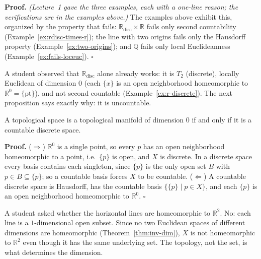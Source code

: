 \documentclass[11pt]{report}
\makeatletter
\newcounter{thmcounter}[section]
\renewenvironment{proof}[1][Proof]{\noindent\textbf{#1.} }{\hfill$\square$\par\vspace{5pt}}
\newcommand{\thmlabel}[1]{\edef\@currentlabel{\arabic{section}.\arabic{thmcounter}}\label{#1}}
\newcommand{\leeref}[1]{\par\smallskip{\raggedleft\footnotesize\textsc{Lee}:\ #1\par}}
\makeatother
\begin{document}
\begin{proof}
\textit{(Lecture~1 gave the three examples, each with a one-line reason; the verifications are in the examples above.)} The examples above exhibit this, organized by the property that fails: $\mathbb{R}_{\mathrm{disc}} \times \mathbb{R}$ fails only second countability (Example~\ref{ex:rdisc-times-r}); the line with two origins fails only the Hausdorff property (Example~\ref{ex:two-origins}); and $\mathbb{Q}$ fails only local Euclideanness (Example~\ref{ex:fails-loceuc}).
\end{proof}

\begin{rembox}\label{rem:dimension-zero-version}
A student observed that $\mathbb{R}_{\mathrm{disc}}$ alone already works: it is $T_2$ (discrete), locally Euclidean of dimension $0$ (each $\{x\}$ is an open neighborhood homeomorphic to $\mathbb{R}^0 = \{\text{pt}\}$), and not second countable (Example~\ref{ex:r-discrete}). The next proposition says exactly why: it is uncountable.
\end{rembox}

\begin{propbox}\thmlabel{prop:zero-manifolds}
A topological space is a topological manifold of dimension $0$ if and only if it is a countable discrete space.
\leeref{Example 1.21}
\end{propbox}

\begin{proof}
($\Rightarrow$) $\mathbb{R}^0$ is a single point, so every $p$ has an open neighborhood homeomorphic to a point, i.e.\ $\{p\}$ is open, and $X$ is discrete. In a discrete space every basis contains each singleton, since $\{p\}$ is the only open set $B$ with $p \in B \subseteq \{p\}$; so a countable basis forces $X$ to be countable. ($\Leftarrow$) A countable discrete space is Hausdorff, has the countable basis $\{\{p\} \mid p \in X\}$, and each $\{p\}$ is an open neighborhood homeomorphic to $\mathbb{R}^0$.
\end{proof}

\begin{rembox}\label{rem:warning-r-disc-x-r-vs-r2}
A student asked whether the horizontal lines are homeomorphic to $\mathbb{R}^2$. No: each line is a $1$-dimensional open subset. Since no two Euclidean spaces of different dimensions are homeomorphic (Theorem~\ref{thm:inv-dim}), $X$ is not homeomorphic to $\mathbb{R}^2$ even though it has the same underlying set. The topology, not the set, is what determines the dimension.
\end{rembox}
\end{document}
